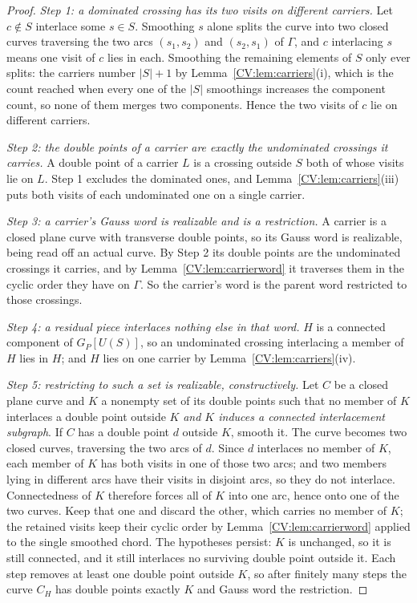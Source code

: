 \begin{proof}\leanok{}
\emph{Step 1: a dominated crossing has its two visits on different carriers.}
Let $c\notin S$ interlace some $s\in S$. Smoothing $s$ alone splits the curve
into two closed curves traversing the two arcs $(s_1,s_2)$ and $(s_2,s_1)$ of
$\Gamma$, and $c$ interlacing $s$ means one visit of $c$ lies in each. Smoothing
the remaining elements of $S$ only ever splits: the carriers number $|S|+1$ by
Lemma~\ref{CV:lem:carriers}(i), which is the count reached when every one of the
$|S|$ smoothings increases the component count, so none of them merges two
components. Hence the two visits of $c$ lie on different carriers.

\emph{Step 2: the double points of a carrier are exactly the undominated
crossings it carries.} A double point of a carrier $L$ is a crossing outside $S$
both of whose visits lie on $L$. Step 1 excludes the dominated ones, and
Lemma~\ref{CV:lem:carriers}(iii) puts both visits of each undominated one on a
single carrier.

\emph{Step 3: a carrier's Gauss word is realizable and is a restriction.} A
carrier is a closed plane curve with transverse double points, so its Gauss word
is realizable, being read off an actual curve. By Step 2 its double points are
the undominated crossings it carries, and by Lemma~\ref{CV:lem:carrierword} it
traverses them in the cyclic order they have on $\Gamma$. So the carrier's word
is the parent word restricted to those crossings.

\emph{Step 4: a residual piece interlaces nothing else in that word.} $H$ is a
connected component of $G_P[U(S)]$, so an undominated crossing interlacing a
member of $H$ lies in $H$; and $H$ lies on one carrier by
Lemma~\ref{CV:lem:carriers}(iv).

\emph{Step 5: restricting to such a set is realizable, constructively.} Let $C$
be a closed plane curve and $K$ a nonempty set of its double points such that no
member of $K$ interlaces a double point outside $K$ \emph{and $K$ induces a
connected interlacement subgraph}. If $C$ has a double point $d$ outside $K$,
smooth it. The curve becomes two closed curves, traversing the two arcs of $d$.
Since $d$ interlaces no member of $K$, each member of $K$ has both visits in one
of those two arcs; and two members lying in different arcs have their visits in
disjoint arcs, so they do not interlace. Connectedness of $K$ therefore forces
all of $K$ into one arc, hence onto one of the two curves. Keep that one and
discard the other, which carries no member of $K$; the retained visits keep
their cyclic order by Lemma~\ref{CV:lem:carrierword} applied to the single smoothed
chord. The hypotheses persist: $K$ is unchanged, so it is still connected, and
it still interlaces no surviving double point outside it. Each step removes at
least one double point outside $K$, so after finitely many steps the curve
$C_H$ has double points exactly $K$ and Gauss word the restriction.


\end{proof}
